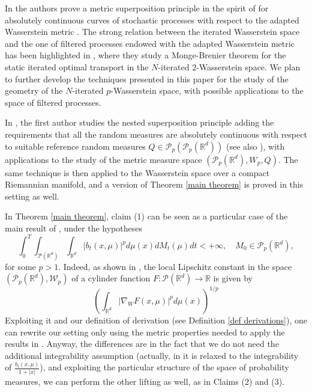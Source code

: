 \documentclass[10pt,leqno]{amsart}
\numberwithin{equation}{section}
\newcommand{\R}{\mathbb{R}}
\newcommand{\PP}{\mathcal{P}}
\begin{document}
In \cite{acciaio2025absolutely} the authors prove a metric superposition principle in the spirit of \cite{lisini2007characterization} for absolutely continuous curves of stochastic processes with respect to the adapted Wasserstein metric \cite{bartl2024wasserstein}. The strong relation between the iterated Wasserstein space and the one of filtered processes endowed with the adapted Wasserstein metric has been highlighted in \cite{beiglbock2025brenier}, where they study a Monge-Brenier theorem for the static iterated optimal transport in the $N$-iterated $2$-Wasserstein space. We plan to further develop the techniques presented in this paper for the study of the geometry of the $N$-iterated $p$-Wasserstein space, with possible applications to the space of filtered processes.  

In \cite{pinziatomic2025}, the first author studies the nested superposition principle adding the requirements that all the random measures are absolutely continuous with respect to suitable reference random measures $Q\in \PP_p(\PP_p(\R^d))$ (see also \cite{dello2022dirichlet,delloschiavo2024massive}), with applications to the study of the metric measure space $(\PP_p(\R^d),W_p,Q)$. The same technique is then applied to the Wasserstein space over a compact Riemannian manifold, and a version of Theorem \ref{main theorem} is proved in this setting as well.


In Theorem \ref{main theorem}, claim (1) can be seen as a particular case of the main result of \cite{stepanov2017three}, 
under the hypotheses
\begin{equation}\label{eq: 4}
\int_0^T \int_{\PP(\R^d)}\int_{\R^d} |b_t(x,\mu)|^pd\mu(x) dM_t(\mu)dt<+\infty, \quad M_0 \in \PP_p(\R^d),
\end{equation}
for some $p>1$. Indeed, as shown in \cite{sodini2023general}, the local Lipschitz constant in the space $(\PP_p(\R^d),\mathcal{W}_p)$ of a cylinder function $F:\PP(\R^d) \to \R$ is given by 
\[ \left(\int_{\R^d} |\nabla_WF(x,\mu)|^pd\mu(x)\right)^{1/p}\]
Exploiting it and our definition of derivation (see Definition \ref{def derivations}), one can rewrite our setting only using the metric properties needed to apply the results in \cite{stepanov2017three}. Anyway, the differences are in the fact that we do not need the additional integrability assumption (actually, in \cite{pinzifirst2025} it is relaxed to the integrability of $\frac{b_t(x,\mu)}{1+|x|}$), and exploiting the particular structure of the space of probability measures, we can perform the other lifting as well, as in Claims (2) and (3).
\end{document}
